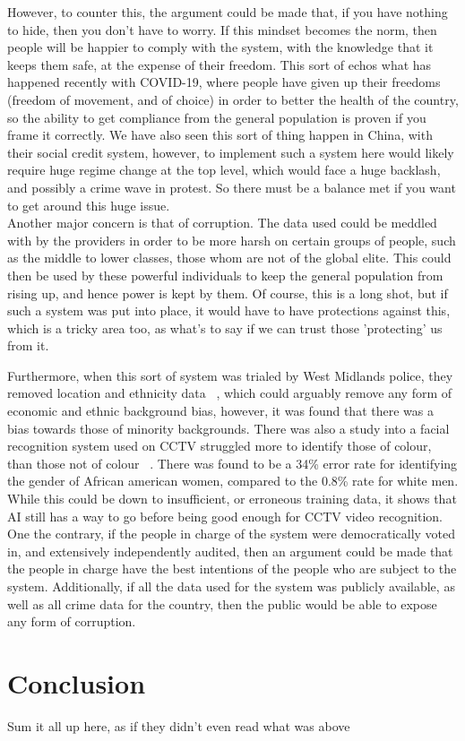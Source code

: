 \documentclass[12pt]{amsart}
\begin{document}
    However, to counter this, the argument could be made that, if you have nothing to hide, then you don't have to
    worry.
    If this mindset becomes the norm, then people will be happier to comply with the system, with the knowledge that
    it keeps them safe, at the expense of their freedom.
    This sort of echos what has happened recently with COVID-19, where people have given up their freedoms (freedom of
    movement, and of choice) in order to better the health of the country, so the ability to get compliance from the
    general population is proven if you frame it correctly.
    We have also seen this sort of thing happen in China, with their social credit system, however, to implement such a
    system here would likely require huge regime change at the top level, which would face a huge backlash, and
    possibly a crime wave in protest.
    So there must be a balance met if you want to get around this huge issue.
    \\

    Another major concern is that of corruption.
    The data used could be meddled with by the providers in order to be more harsh on certain groups of people, such as
    the middle to lower classes, those whom are not of the global elite.
    This could then be used by these powerful individuals to keep the general population from rising up, and hence power
    is kept by them.
    Of course, this is a long shot, but if such a system was put into place, it would have to have protections against
    this, which is a tricky area too, as what's to say if we can trust those 'protecting' us from it.

    Furthermore, when this sort of system was trialed by West Midlands police, they removed location and ethnicity data
    ~\cite{wmp-trial}, which could arguably remove any form of economic and ethnic background bias, however, it was
    found that there was a bias towards those of minority backgrounds.
    There was also a study into a facial recognition system used on CCTV struggled more to identify those of colour,
    than those not of colour ~\cite{ifsec-bias-article}.
    There was found to be a 34\% error rate for identifying the gender of African american women, compared to the
    0.8\% rate for white men.
    While this could be down to insufficient, or erroneous training data, it shows that AI still has a way to go before
    being good enough for CCTV video recognition.
    \\

    One the contrary, if the people in charge of the system were democratically voted in, and extensively independently
    audited, then an argument could be made that the people in charge have the best intentions of the people who are
    subject to the system.
    Additionally, if all the data used for the system was publicly available, as well as all crime data for the
    country, then the public would be able to expose any form of corruption.


    \section{Conclusion}\label{sec:conclusion}

    Sum it all up here, as if they didn't even read what was above ~\cite{mr-book}

    {}
    
\end{document}
